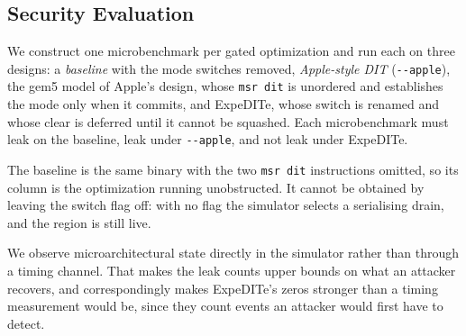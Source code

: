 %
%

\subsection{Security Evaluation}\label{sec:eval:soundness}

We construct one microbenchmark per gated optimization and run each on three
designs: a \emph{baseline} with the mode switches removed, \emph{Apple-style
DIT} (\texttt{-{}-apple}), the gem5 model of Apple's design, whose
\texttt{msr dit} is unordered and establishes the mode only when it commits,
and ExpeDITe, whose switch is renamed and whose clear
is deferred until it cannot be squashed. Each microbenchmark must leak on the
baseline, leak under \texttt{-{}-apple}, and not leak under ExpeDITe.

The baseline is the same binary with the two \texttt{msr dit} instructions
omitted, so its column is the optimization running unobstructed. It cannot be
obtained by leaving the switch flag off: with no flag the simulator selects a
serialising drain, and the region is still live.

We observe microarchitectural state directly in the simulator rather than
through a timing channel. That makes the leak counts upper bounds on what an
attacker recovers, and correspondingly makes ExpeDITe's zeros stronger than a
timing measurement would be, since they count events an attacker would first
have to detect.

